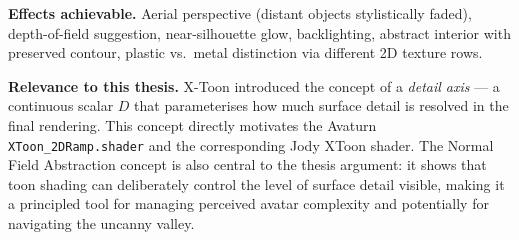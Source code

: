 \documentclass[11pt, a4paper]{article}
\begin{document}
\textbf{Effects achievable.} Aerial perspective (distant objects stylistically faded), depth-of-field suggestion, near-silhouette glow, backlighting, abstract interior with preserved contour, plastic vs.\ metal distinction via different 2D texture rows.

\textbf{Relevance to this thesis.} X-Toon introduced the concept of a \textit{detail axis} --- a continuous scalar $D$ that parameterises how much surface detail is resolved in the final rendering. This concept directly motivates the Avaturn \texttt{XToon\_2DRamp.shader} and the corresponding Jody XToon shader. The Normal Field Abstraction concept is also central to the thesis argument: it shows that toon shading can deliberately control the level of surface detail visible, making it a principled tool for managing perceived avatar complexity and potentially for navigating the uncanny valley.
\end{document}
